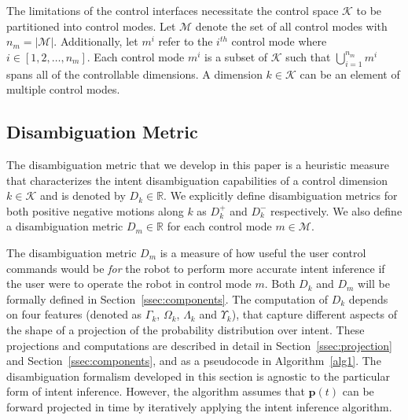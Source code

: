 \documentclass[natbib, twocolumn]{svjour3}          %
\begin{document}
The limitations of the control interfaces necessitate the control space $\mathcal{K}$ to be partitioned into control modes. Let $\mathcal{M}$ denote the set of all control modes with $n_m = \vert\mathcal{M}\vert$. Additionally, let $m^i$ refer to the $i^{th}$ control mode where $i \in [1,2,\dots,n_m]$. Each control mode $m^i$ is a subset of $\mathcal{K}$ such that $\bigcup\limits_{i=1}^{n_m} m^i$ spans all of the controllable dimensions. A dimension $k \in \mathcal{K}$ can be an element of multiple control modes.

\subsection{Disambiguation Metric}\label{ssec:disamb}
The disambiguation metric that we develop in this paper is a heuristic measure that characterizes the intent disambiguation capabilities of a control dimension $k \in \mathcal{K}$ and is denoted by $D_k \in \mathbb{R}$. We explicitly define disambiguation metrics for both positive negative motions along $k$ as $D_k^{+}$ and $D_k^{-}$ respectively. We also define a disambiguation metric $D_m \in \mathbb{R}$ for each control mode $m \in \mathcal{M}$.

The disambiguation metric $D_m$ is a measure of how useful the user control commands would be \textit{for} the robot to perform more accurate intent inference if the user were to operate the robot in control mode $m$. Both $D_k$ and $D_m$ will be formally defined in Section~\ref{ssec:components}.
The computation of $D_k$ depends on four features (denoted as $\Gamma_k$, $\Omega_k$, $\Lambda_k$ and $\Upsilon_k$), that capture different aspects of the shape of a projection of the probability distribution over intent. These projections and computations are described in detail in Section~\ref{ssec:projection} and Section~\ref{ssec:components}, and as a pseudocode in Algorithm~\ref{alg1}. The disambiguation formalism developed in this section is agnostic to the particular form of intent inference. However, the algorithm assumes that $\boldsymbol{p}(t)$ can be forward projected in time by iteratively applying the intent inference algorithm. 
\end{document}
